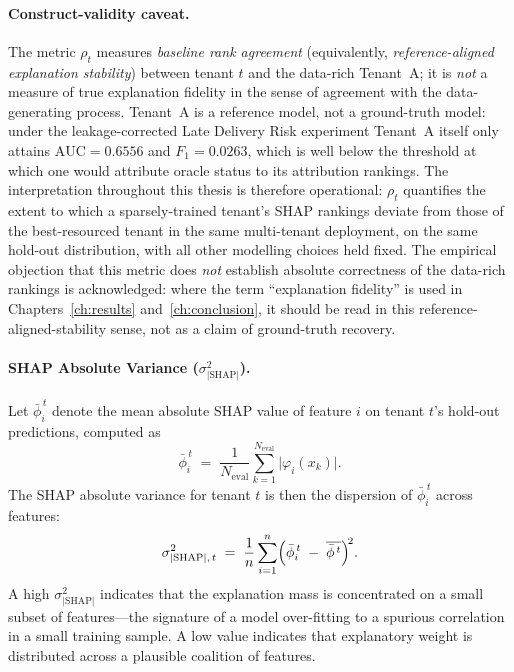 \paragraph{Construct-validity caveat.}\label{para:rho-caveat}
The metric $\rho_t$ measures \emph{baseline rank agreement} (equivalently,
\emph{reference-aligned explanation stability}) between tenant $t$ and the
data-rich Tenant~A; it is \emph{not} a measure of true explanation fidelity
in the sense of agreement with the data-generating process. Tenant~A is a
reference model, not a ground-truth model: under the leakage-corrected
Late Delivery Risk experiment Tenant~A itself only attains
$\text{AUC} = 0.6556$ and $F_1 = 0.0263$, which is well below the
threshold at which one would attribute oracle status to its attribution
rankings. The interpretation throughout this thesis is therefore
operational: $\rho_t$ quantifies the extent to which a sparsely-trained
tenant's SHAP rankings deviate from those of the best-resourced tenant in
the same multi-tenant deployment, on the same hold-out distribution, with
all other modelling choices held fixed. The empirical objection that this
metric does \emph{not} establish absolute correctness of the data-rich
rankings is acknowledged: where the term ``explanation fidelity'' is used
in Chapters~\ref{ch:results} and~\ref{ch:conclusion}, it should be read in
this reference-aligned-stability sense, not as a claim of ground-truth
recovery.

\paragraph{SHAP Absolute Variance ($\sigma^2_{|\text{SHAP}|}$).}
Let $\bar{\phi}_i^{\,t}$ denote the mean absolute SHAP value of feature
$i$ on tenant $t$'s hold-out predictions, computed as
\begin{equation}
\bar{\phi}_i^{\,t} \;=\;
\frac{1}{N_{\text{eval}}} \sum_{k=1}^{N_{\text{eval}}}
\bigl|\varphi_i(x_k)\bigr|.
\label{eq:shap-mean-abs}
\end{equation}
The SHAP absolute variance for tenant $t$ is then the dispersion of
$\bar{\phi}_i^{\,t}$ across features:
\begin{equation}
\sigma^2_{|\text{SHAP}|,\,t} \;=\;
\frac{1}{n} \sum_{i=1}^{n}
\Bigl(\bar{\phi}_i^{\,t} \;-\; \overline{\bar{\phi}^{\,t}}\Bigr)^{\!2}.
\label{eq:shap-var}
\end{equation}
A high $\sigma^2_{|\text{SHAP}|}$ indicates that the explanation mass is
concentrated on a small subset of features---the signature of a model
over-fitting to a spurious correlation in a small training sample. A low
value indicates that explanatory weight is distributed across a plausible
coalition of features.

